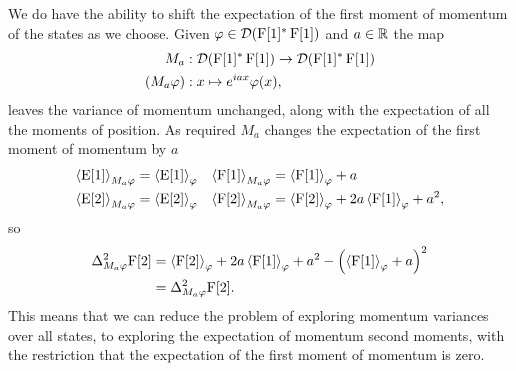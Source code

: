 We do have the ability to shift the expectation of the first moment of momentum of the states as we choose. Given $\varphi\in\mathcal{D}(\operatorname{F}[1]^*\operatorname{F}[1])$ and $a\in\mathbb{R}$ the map
\begin{align}
  M_a &:\mathcal{D}(\operatorname{F}[1]^*\operatorname{F}[1])\to\mathcal{D}(\operatorname{F}[1]^*\operatorname{F}[1])\\
  (M_a\varphi)&:x\mapsto e^{i a x}\varphi(x),
\end{align}
leaves the variance of momentum unchanged, along with the expectation of all the moments of position. As required $M_a$ changes the expectation of the first moment of momentum by $a$
\begin{align}
  \left\langle{\operatorname{E}[1]}\right\rangle_{M_a\varphi} &= \left\langle{\operatorname{E}[1]}\right\rangle_{\varphi} & \left\langle{\operatorname{F}[1]}\right\rangle_{M_a\varphi} &= \left\langle{\operatorname{F}[1]}\right\rangle_{\varphi} + a\\
  \left\langle{\operatorname{E}[2]}\right\rangle_{M_a\varphi} &= \left\langle{\operatorname{E}[2]}\right\rangle_{\varphi}& \left\langle{\operatorname{F}[2]}\right\rangle_{M_a\varphi} &= \left\langle{\operatorname{F}[2]}\right\rangle_{\varphi} + 2a\left\langle{\operatorname{F}[1]}\right\rangle_{\varphi} + a^2,
\end{align}
so
\begin{align}
  \var[M_a\varphi]{\opf[2]} &= \expe{\opf[2]}{\varphi} + 2a\expe{\opf[1]}{\varphi} + a^2 - \left(\expe{\opf[1]}{\varphi} + a\right)^2\\
                            &= \var[M_a\varphi]{\opf[2]}.
\end{align}
This means that we can reduce the problem of exploring momentum variances over all states, to exploring the expectation of momentum second moments, with the restriction that the expectation of the first moment of momentum is zero.

